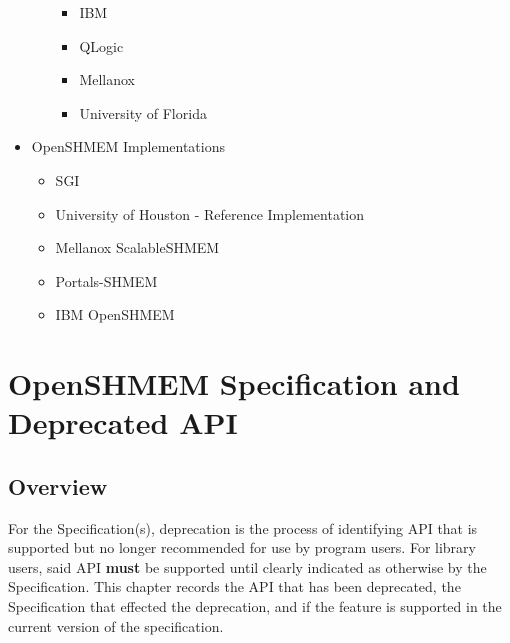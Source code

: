 \begin{itemize}
\begin{itemize}
\begin{itemize}
    \item IBM
    \item QLogic
    \item Mellanox
    \item University of Florida
    \end{itemize}
  \end{itemize}
\item OpenSHMEM Implementations 
 \begin{itemize}
  \item SGI \openshmem
  \item University of Houston - \openshmem Reference Implementation
  \item Mellanox ScalableSHMEM
  \item Portals-SHMEM
  \item IBM OpenSHMEM
  \end{itemize}
\end{itemize}








\chapter{OpenSHMEM Specification and Deprecated API}\label{sec:dep_api}

\section{Overview}\label{subsec:dep_overview}
For the \openshmem Specification(s), deprecation is the process of identifying
API that is supported but no longer recommended for use by program users. For
\openshmem library users, said API \textbf{must} be supported until clearly
indicated as otherwise by the Specification. This chapter records the
API that has been deprecated, the \openshmem Specification that effected the
deprecation, and if the feature is supported in the current version of the
specification.  

